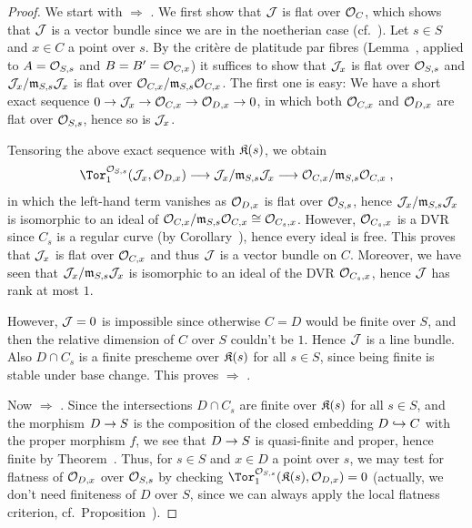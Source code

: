\documentclass[a4paper,parskip=half,numbers=enddot, DIV=12]{scrreprt}
\begin{document}
\begin{proof}
	We start with  $\Rightarrow$ . We first show that $\mathcal{J}$ is flat over $\mathcal{O}_C$, which shows that $\mathcal{J}$ is a vector bundle since we are in the noetherian case (cf.\ \cite[Proposition~1.3.2]{homalg}). Let $s\in S$ and $x\in C$ a point over $s$. By the critère de platitude par fibres (Lemma~, applied to $A=\mathcal{O}_{S,s}$ and $B=B'=\mathcal{O}_{C,x}$) it suffices to show that $\mathcal{J}_x$ is flat over $\mathcal{O}_{S,s}$ and $\mathcal{J}_x/\mathfrak{m}_{S,s}\mathcal{J}_x$ is flat over $\mathcal{O}_{C,x}/\mathfrak{m}_{S,s}\mathcal{O}_{C,x}$. The first one is easy: We have a short exact sequence $0\morphism \Jj_x\morphism\Oo_{C,x}\morphism\Oo_{D,x}\morphism 0$, in which both $\mathcal{O}_{C,x}$ and $\mathcal{O}_{D,x}$ are flat over $\mathcal{O}_{S,s}$, hence so is $\mathcal{J}_x$. 
	
	Tensoring  the above exact sequence with $\mathfrak{K}(s)$, we obtain
	\begin{align*}
		\Tor_1^{\Oo_{S,s}}(\Jj_x,\Oo_{D,x})\morphism \Jj_x/\mm_{S,s}\Jj_x\morphism \Oo_{C,x}/\mm_{S,s}\Oo_{C,x}\;,
	\end{align*}
	in which the left-hand term vanishes as $\mathcal{O}_{D,x}$ is flat over $\mathcal{O}_{S,s}$, hence $\mathcal{J}_x/\mathfrak{m}_{S,s}\mathcal{J}_x$ is isomorphic to an ideal of $\mathcal{O}_{C,x}/\mathfrak{m}_{S,s}\mathcal{O}_{C,x}\cong \mathcal{O}_{C_s,x}$. However, $\mathcal{O}_{C_s,x}$ is a DVR since $C_s$ is a regular curve (by Corollary~), hence every ideal is free. This proves that $\mathcal{J}_x$ is flat over $\mathcal{O}_{C,x}$ and thus $\mathcal{J}$ is a vector bundle on $C$. Moreover, we have seen that $\mathcal{J}_x/\mathfrak{m}_{S,s}\mathcal{J}_x$ is isomorphic to an ideal of the DVR $\mathcal{O}_{C_s,x}$, hence $\mathcal{J}$ has rank at most $1$.
	
	However, $\mathcal{J}=0$ is impossible since otherwise $C=D$ would be finite over $S$, and then the relative dimension of $C$ over $S$ couldn't be $1$. Hence $\mathcal{J}$ is a line bundle. Also $D\cap C_s$ is a finite prescheme over $\mathfrak{K}(s)$ for all $s\in S$, since being finite is stable under base change. This proves  $\Rightarrow$ .
	
	Now  $\Rightarrow$ . Since the intersections $D\cap C_s$ are finite over $\mathfrak{K}(s)$ for all $s\in S$, and the morphism $D\morphism S$ is the composition of the closed embedding $D\monomorphism C$ with the proper morphism $f$, we see that $D\morphism S$ is quasi-finite and proper, hence finite by Theorem~. Thus, for $s\in S$ and $x\in D$ a point over $s$, we may test for flatness of $\mathcal{O}_{D,x}$ over $\mathcal{O}_{S,s}$ by checking $\Tor_1^{\Oo_{S,s}}(\KK(s),\Oo_{D,x})=0$ (actually, we don't need finiteness of $D$ over $S$, since we can always apply the local flatness criterion, cf.\ Proposition~).
	

\end{proof}
\end{document}
